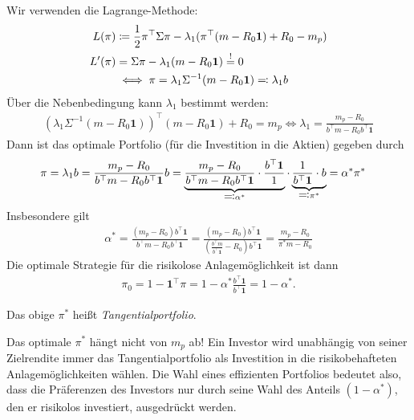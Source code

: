 \documentclass[a4paper,twoside,DIV15,BCOR12mm]{scrbook}
\begin{document}
Wir verwenden die Lagrange-Methode:
\begin{align*}
L(\pi) &\da \frac12 \pi^\top \Sigma \pi - \lambda_1(\pi^\top(m-R_0\mathbf 1)+ R_0 - m_p) \\
L'(\pi) &= \Sigma\pi - \lambda_1(m-R_0\mathbf 1) \stackrel!= 0\\
&\iff \pi = \lambda_1\Sigma^{-1}(m-R_0\mathbf 1) \ad \lambda_1 b
\end{align*}
Über die Nebenbedingung kann $\lambda_1$ bestimmt werden:
\begin{align*}
(\lambda_1\Sigma^{-1}(m- R_0\mathbf 1))^\top(m-R_0\mathbf 1) + R_0 = m_p \iff \lambda_1=\frac{m_p-R_0}{b^\top m - R_0b^\top \mathbf 1}
\end{align*}
Dann ist das optimale Portfolio (für die Investition in die Aktien) gegeben durch
\begin{align*}
\pi&=\lambda_1b =\frac{m_p - R_0}{b^\top m - R_0b^\top\mathbf 1} b = \underbrace{\frac{m_p-R_0}{b^\top m - R_0b^\top \mathbf 1}\cdot\frac{b^\top\mathbf 1}1}_{\ad \alpha^*}\cdot\underbrace{\frac1{b^\top\mathbf 1}\cdot b}_{\ad \pi^*} = \alpha^* \pi^*
\end{align*}
Insbesondere gilt
\begin{align*}
\alpha^* = \frac{(m_p-R_0)b^\top \mathbf 1}{b^\top m - R_0 b^\top \mathbf 1} = 
\frac{(m_p-R_0)b^\top \mathbf 1}{(\frac{b^\top m}{b^\top\mathbf 1} - R_0) b^\top \mathbf 1}
= \frac{m_p-R_0}{\pi^* m - R_0}
\end{align*}
Die optimale Strategie für die risikolose Anlagemöglichkeit ist dann
\begin{align*}
\pi_0 = 1 - \mathbf 1^\top\pi = 1 - \alpha^* \frac{b^\top\mathbf 1}{b^\top\mathbf 1} = 1- \alpha^*.
\end{align*}

\begin{definition}
Das obige $\pi^*$ heißt \emph{Tangentialportfolio}.
\end{definition}

\begin{bemerkung}
Das optimale $\pi^*$ hängt nicht von $m_p$ ab! Ein Investor wird unabhängig von seiner Zielrendite immer das Tangentialportfolio als Investition in die risikobehafteten Anlagemöglichkeiten wählen. Die Wahl eines effizienten Portfolios bedeutet also, dass die Präferenzen des Investors nur durch seine Wahl des Anteils $(1-\alpha^*)$, den er risikolos investiert, ausgedrückt werden.
\end{bemerkung}
\end{document}
